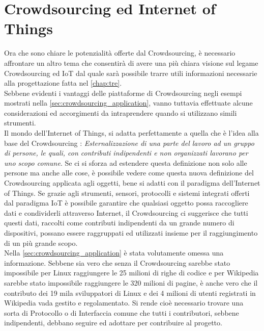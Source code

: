 \section{Crowdsourcing ed Internet of Things}
Ora che sono chiare le potenzialità offerte dal Crowdsourcing, è necessario affrontare un altro tema che consentirà di avere una più chiara visione sul legame Crowdsourcing ed IoT dal quale sarà possibile trarre utili informazioni necessarie alla progettazione fatta nel \autoref{chap:tre}.\\
Sebbene evidenti i vantaggi delle piattaforme di Crowdsourcing negli esempi mostrati nella \autoref{sec:crowdsourcing_application}, vanno tuttavia effettuate alcune considerazioni ed accorgimenti da intraprendere quando si utilizzano simili strumenti.\\
Il mondo dell'Internet of Things, si adatta perfettamente a quella che è l'idea alla base del Crowdsourcing : \textit{Esternalizzazione di una parte del lavoro ad un gruppo di persone, le quali, con contributi indipendenti e non organizzati lavorano per uno scopo comune}. Se ci si sforza ad estendere questa definizione non solo alle persone ma anche alle cose, è possibile vedere come questa nuova definizione del Crowdsourcing applicata agli oggetti, bene si adatti con il paradigma dell'Internet of Things.
Se grazie agli strumenti, sensori, protocolli e sistemi integrati offerti dal paradigma IoT è possibile garantire che qualsiasi oggetto possa raccogliere dati e condividerli attraverso Internet, il Crowdsourcing ci suggerisce che tutti questi dati, raccolti come contributi indipendenti da un grande numero di dispositivi, possano essere raggruppati ed utilizzati insieme per il raggiungimento di un più grande scopo. \cite{famous:paper_crowdsourcing_4} \cite{famous:paper_crowdsourcing_2}\\
Nella \autoref{sec:crowdsourcing_application} è stata volutamente omessa una informazione. Sebbene sia vero che senza il Crowdsourcing sarebbe stato impossibile per Linux raggiungere le 25 milioni di righe di codice e per Wikipedia sarebbe stato impossibile raggiungere le 320 milioni di pagine, è anche vero che il contributo dei 19 mila sviluppatori di Linux e dei 4 milioni di utenti registrati in Wikipedia vada gestito e regolamentato. Si rende cioè necessario trovare una sorta di Protocollo o di Interfaccia comune che tutti i contributori, sebbene indipendenti, debbano seguire ed adottare per contribuire al progetto.\\
